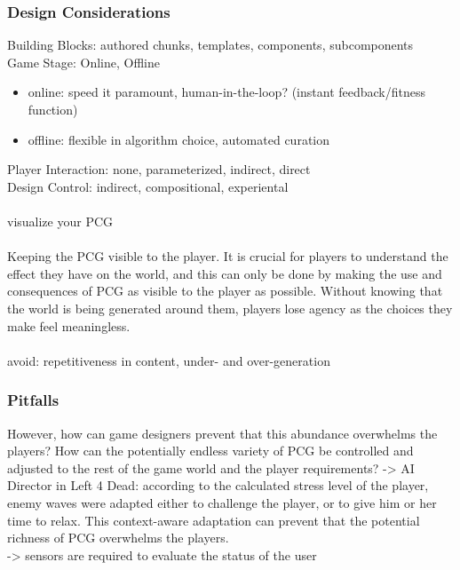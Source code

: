 \documentclass[MGS,Master,english]{twbook}%
\begin{document}
\subsubsection{Design Considerations}
Building Blocks: authored chunks, templates, components, subcomponents\\
Game Stage: Online, Offline
	\begin{itemize}
	\item online: speed it paramount, human-in-the-loop? (instant feedback/fitness function)
	\item offline: flexible in algorithm choice, automated curation
\end{itemize}
Player Interaction: none, parameterized, indirect, direct\\
Design Control: indirect, compositional, experiental\\
\\
visualize your PCG\\
\\
Keeping the PCG visible to the player. It is crucial for players to understand the effect they have on the world, and this can only be done by making the use and consequences of PCG as visible to the player as possible. Without knowing that the world is being generated around them, players lose agency as the choices they make feel meaningless. \cite{pcg::endlessWeb}\\
\\
avoid: repetitiveness in content, under- and over-generation

\subsubsection{Pitfalls}
\cite{pcg::shortHistoryOfDynamicAndPCG}
However, how can game designers prevent that this abundance overwhelms the players? How can the potentially endless variety of PCG be controlled and adjusted to the rest of the game world and the player requirements? -> AI Director in Left 4 Dead: according to the calculated stress level of the player, enemy waves were adapted either to challenge the player, or to give him or her time to relax. This context-aware adaptation can prevent that the potential richness of PCG overwhelms the players.\\
-> sensors are required to evaluate the status of the user
\end{document}
